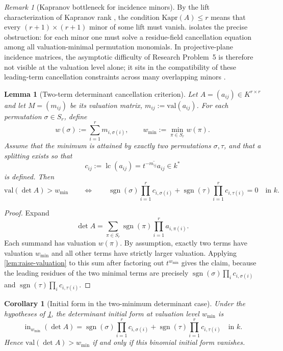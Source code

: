 \documentclass[11pt]{amsart}
\numberwithin{equation}{section}
\theoremstyle{plain}
\newtheorem{lemma}[theorem]{Lemma}
\newtheorem{corollary}[theorem]{Corollary}
\theoremstyle{definition}
\theoremstyle{remark}
\newtheorem{remark}[theorem]{Remark}
\newcommand{\Kapr}{\mathrm{Kapr}}
\newcommand{\val}{\mathrm{val}}
\begin{document}
\begin{remark}[Kapranov bottleneck for incidence minors]
\label{rem:kapr-bottleneck-minors}
By the lift characterization of Kapranov rank \cite{develinSantosSturmfels2005}, the condition $\Kapr(A)\le r$ means that every
$(r+1)\times(r+1)$ minor of some lift must vanish.  isolates the precise obstruction: for each
minor one must solve a residue-field cancellation equation among all valuation-minimal permutation monomials. In projective-plane
incidence matrices, the asymptotic difficulty of Research Problem~5 is therefore not visible at the valuation level alone; it sits in the
compatibility of these leading-term cancellation constraints across many overlapping minors \cite{gutermanShitov2016}.
\end{remark}

\begin{lemma}[Two-term determinant cancellation criterion]
\label{lem:two-term-det}
Let $A=(a_{ij})\in K^{r\times r}$ and let $M=(m_{ij})$ be its valuation matrix, $m_{ij}:=\val(a_{ij})$. For each permutation
$\sigma\in S_r$, define
\[
w(\sigma):=\sum_{i=1}^r m_{i,\sigma(i)}, \qquad w_{\min}:=\min_{\pi\in S_r} w(\pi).
\]
Assume that the minimum is attained by exactly two permutations $\sigma,\tau$, and that a splitting exists so that
\[
c_{ij}:=\operatorname{lc}(a_{ij})=\overline{t^{-m_{ij}}a_{ij}}\in k^*
\]
is defined. Then
\[
\val(\det A)>w_{\min}
\qquad\Longleftrightarrow\qquad
\operatorname{sgn}(\sigma)\prod_{i=1}^r c_{i,\sigma(i)}
+ \operatorname{sgn}(\tau)\prod_{i=1}^r c_{i,\tau(i)}=0
\quad\text{in }k.
\]
\end{lemma}

\begin{proof}
Expand
\[
\det A = \sum_{\pi\in S_r}\operatorname{sgn}(\pi)\prod_{i=1}^r a_{i,\pi(i)}.
\]
Each summand has valuation $w(\pi)$. By assumption, exactly two terms have valuation $w_{\min}$ and all other terms have strictly larger
valuation. Applying \cref{lem:raise-valuation} to this sum after factoring out $t^{w_{\min}}$ gives the claim, because the leading residues
of the two minimal terms are precisely
$\operatorname{sgn}(\sigma)\prod_i c_{i,\sigma(i)}$ and $\operatorname{sgn}(\tau)\prod_i c_{i,\tau(i)}$.
\end{proof}

\begin{corollary}[Initial form in the two-minimum determinant case]
Under the hypotheses of \cref{lem:two-term-det}, the determinant initial form at valuation level $w_{\min}$ is
\[
\operatorname{in}_{w_{\min}}(\det A)=
\operatorname{sgn}(\sigma)\prod_{i=1}^r c_{i,\sigma(i)}
+
\operatorname{sgn}(\tau)\prod_{i=1}^r c_{i,\tau(i)}
\quad\text{in }k.
\]
Hence $\val(\det A)>w_{\min}$ if and only if this binomial initial form vanishes.
\end{corollary}
\end{document}
